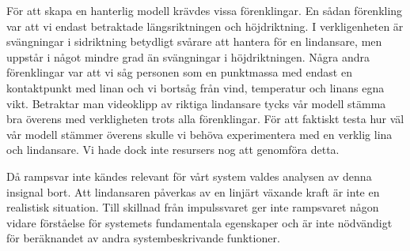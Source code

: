 För att skapa en hanterlig modell krävdes vissa förenklingar. En sådan förenkling var att vi endast betraktade längsriktningen och höjdriktning. I verkligenheten är svängningar i sidriktning betydligt svårare att hantera för en lindansare, men uppstår i något mindre grad än svängningar i höjdriktningen. Några andra förenklingar var att vi såg personen som en punktmassa med endast en kontaktpunkt med linan och vi bortsåg från vind, temperatur och linans egna vikt. Betraktar man videoklipp av riktiga lindansare tycks vår modell stämma bra överens med verkligheten trots alla förenklingar. För att faktiskt testa hur väl vår modell stämmer överens skulle vi behöva experimentera med en verklig lina och lindansare. Vi hade dock inte resursers nog att genomföra detta. 

Då rampsvar inte kändes relevant för vårt system valdes analysen av denna insignal bort. Att lindansaren påverkas av en linjärt växande kraft är inte en realistisk situation. Till skillnad från impulssvaret ger inte rampsvaret någon vidare förståelse för systemets fundamentala egenskaper och är inte nödvändigt för beräknandet av andra systembeskrivande funktioner.
